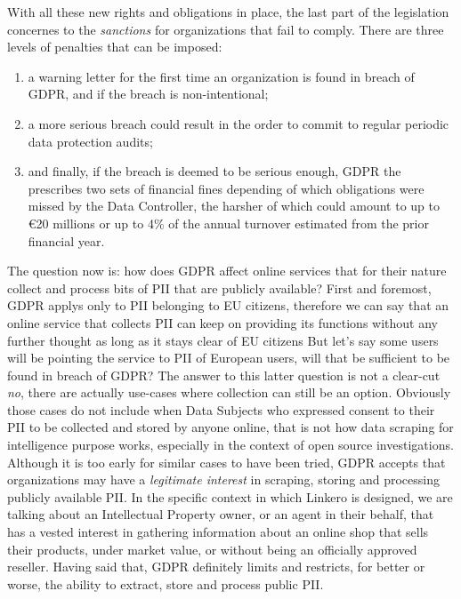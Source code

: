 With all these new rights and obligations in place, the last part of the
legislation concernes to the \emph{sanctions} for organizations that fail to
comply. There are three levels of penalties that can be imposed:
\begin{enumerate}
  \item a warning letter for the first time an organization is found in breach
  of GDPR, and if the breach is non-intentional;
  \item a more serious breach could result in the order to commit to regular
  periodic data protection audits;
  \item and finally, if the breach is deemed to be serious enough, GDPR the
  prescribes two sets of financial fines depending of which obligations were
  missed by the Data Controller, the harsher of which could amount to up to
  \euro20 millions or up to 4\% of the annual turnover estimated from the
  prior financial year.
\end{enumerate}

The question now is: how does GDPR affect online services that for their
nature collect and process bits of PII that are publicly available? First and
foremost, GDPR applys only to PII belonging to EU citizens, therefore we can say
that an online service that collects PII can keep on providing its functions
without any further thought as long as it stays clear of EU citizens But let's
say some users will be pointing the service to PII of European users, will that
be sufficient to be found in breach of GDPR? The answer to this latter question
is not a clear-cut \emph{no}, there are actually use-cases where collection can
still be an option. Obviously those cases do not include when Data Subjects
who expressed consent to their PII to be collected and stored by anyone online,
that is not how data scraping for intelligence purpose works, especially in the
context of open source investigations. Although it is too early for similar
cases to have been tried, GDPR accepts that organizations may have a
\emph{legitimate interest} in scraping, storing and processing publicly
available PII. In the specific context in which Linkero is designed, we are
talking about an Intellectual Property owner, or an agent in their behalf, that
has a vested interest in gathering information about an online shop that sells
their products, under market value, or without being an officially approved
reseller. Having said that, GDPR definitely limits and restricts, for better or
worse, the ability to extract, store and process public PII.

